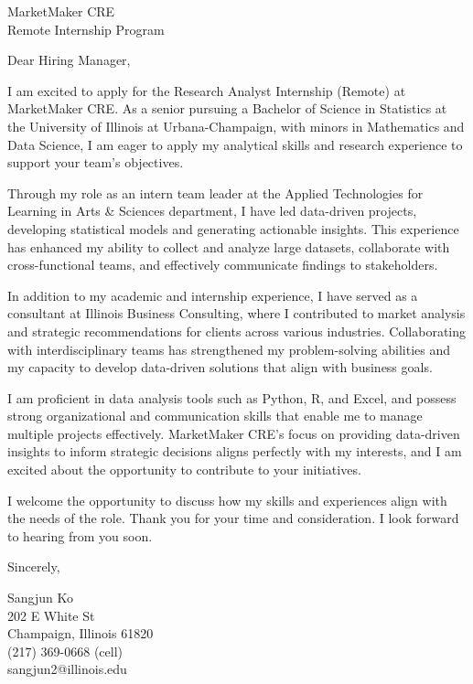 \documentclass{letter}
\begin{document}
\begin{letter}{MarketMaker CRE\\
    Remote Internship Program}


\opening{Dear Hiring Manager,}

I am excited to apply for the Research Analyst Internship (Remote) at MarketMaker CRE. As a senior pursuing a Bachelor of Science in Statistics at the University of Illinois at Urbana-Champaign, with minors in Mathematics and Data Science, I am eager to apply my analytical skills and research experience to support your team’s objectives.

Through my role as an intern team leader at the Applied Technologies for Learning in Arts \& Sciences department, I have led data-driven projects, developing statistical models and generating actionable insights. This experience has enhanced my ability to collect and analyze large datasets, collaborate with cross-functional teams, and effectively communicate findings to stakeholders.

In addition to my academic and internship experience, I have served as a consultant at Illinois Business Consulting, where I contributed to market analysis and strategic recommendations for clients across various industries. Collaborating with interdisciplinary teams has strengthened my problem-solving abilities and my capacity to develop data-driven solutions that align with business goals.

I am proficient in data analysis tools such as Python, R, and Excel, and possess strong organizational and communication skills that enable me to manage multiple projects effectively. MarketMaker CRE’s focus on providing data-driven insights to inform strategic decisions aligns perfectly with my interests, and I am excited about the opportunity to contribute to your initiatives.

I welcome the opportunity to discuss how my skills and experiences align with the needs of the role. Thank you for your time and consideration. I look forward to hearing from you soon.


\closing{Sincerely,
}

Sangjun Ko\\
202 E White St\\
Champaign, Illinois 61820\\
(217) 369-0668 (cell)\\sangjun2@illinois.edu
\end{letter}
\end{document}
